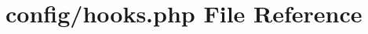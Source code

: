 \hypertarget{application_2config_2hooks_8php}{}\section{config/hooks.php File Reference}
\label{application_2config_2hooks_8php}
